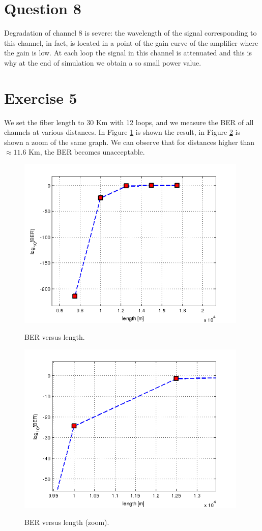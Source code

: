 \documentclass[a4paper,10pt]{report}
\begin{document}
\section*{Question 8}
Degradation of channel 8 is severe: the wavelength of the signal corresponding to this channel, in fact, is located in a
point of the gain curve of the amplifier where the gain is low.
At each loop the signal in this channel is attenuated and this is why at the end of simulation we obtain a so small power value.

\section*{Exercise 5}
We set the fiber length to 30 Km with 12 loops, and we measure the BER of all channels at various distances.
In Figure \ref{es5} is shown the result, in Figure \ref{es5zoom} is shown a zoom of the same graph.
We can observe that for distances higher than $\approx 11.6$ Km, the BER becomes unacceptable.

\begin{figure}[!ht]
   \centering
   \includegraphics[width=11cm]{es5.png}\\
   \caption{BER versus length.}
   \label{es5}
\end{figure}

\begin{figure}[!ht]
   \centering
   \includegraphics[width=11cm]{es5zoom.png}\\
   \caption{BER versus length (zoom).}
   \label{es5zoom}
\end{figure}
\end{document}
